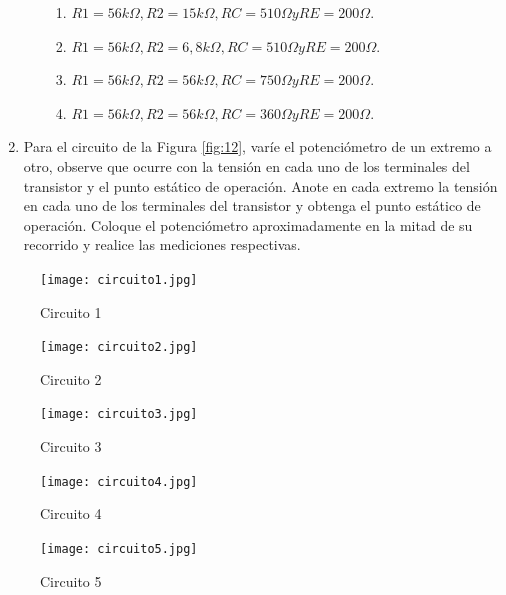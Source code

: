 \documentclass[10pt, a4paper]{article}
\begin{document}
\begin{enumerate}
\begin{enumerate}
\begin{enumerate}
                \item $R1=56k\Omega, R2=15k\Omega, RC=510\Omega y RE=200\Omega.$ \label{pru11}
                \item $R1=56k\Omega, R2=6,8k\Omega, RC=510\Omega y RE=200\Omega.$ \label{pru12}
                \item $R1=56k\Omega, R2=56k\Omega, RC=750\Omega y RE=200\Omega.$ \label{pru13}
                \item $R1=56k\Omega, R2=56k\Omega, RC=360\Omega y RE=200\Omega.$ \label{pru14}
            \end{enumerate}
        \end{enumerate}
        \item 	Para el circuito de la Figura \ref{fig:12}, varíe el potenciómetro de un extremo a otro, observe que ocurre con la tensión en cada uno de los terminales del transistor y el punto estático de operación. Anote en cada extremo la tensión en cada uno de los terminales del transistor y obtenga el punto estático de operación. Coloque el potenciómetro aproximadamente en la mitad de su recorrido y realice las mediciones respectivas. \label{i4}
    \end{enumerate}

    \newpage

    \begin{figure}[h!]
        \centering
        \texttt{[image: circuito1.jpg]}
        \caption{\label{fig:7} Circuito 1}
    \end{figure}

    \begin{figure}[h!]
        \centering
        \texttt{[image: circuito2.jpg]}
        \caption{\label{fig:8} Circuito 2}
    \end{figure}

    \begin{figure}[h!]
        \centering
        \texttt{[image: circuito3.jpg]}
        \caption{\label{fig:9} Circuito 3}
    \end{figure}

    \newpage

    \begin{figure}[h!]
        \centering
        \texttt{[image: circuito4.jpg]}
        \caption{\label{fig:10} Circuito 4}
    \end{figure}

    \begin{figure}[h!]
        \centering
        \texttt{[image: circuito5.jpg]}
        \caption{\label{fig:11} Circuito 5}
    \end{figure}
\end{document}
